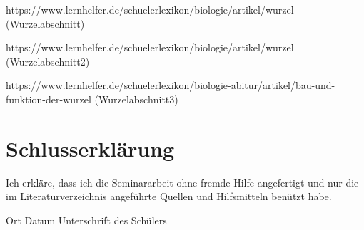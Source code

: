 \documentclass[
a4paper, 
11pt, 
ngerman,
listof=totoc,
bibliography=totocnumbered,
abstracton
]{scrreprt}
\begin{document}
\printbibliography

https://www.lernhelfer.de/schuelerlexikon/biologie/artikel/wurzel (Wurzelabschnitt)

https://www.lernhelfer.de/schuelerlexikon/biologie/artikel/wurzel (Wurzelabschnitt2)

https://www.lernhelfer.de/schuelerlexikon/biologie-abitur/artikel/bau-und-funktion-der-wurzel (Wurzelabschnitt3)




\chapter {Schlusserklärung}

Ich erkläre, dass ich die Seminararbeit ohne fremde Hilfe angefertigt und nur die im Literaturverzeichnis angeführte Quellen und Hilfsmitteln benützt habe.


Ort Datum Unterschrift des Schülers 
\end{document}
